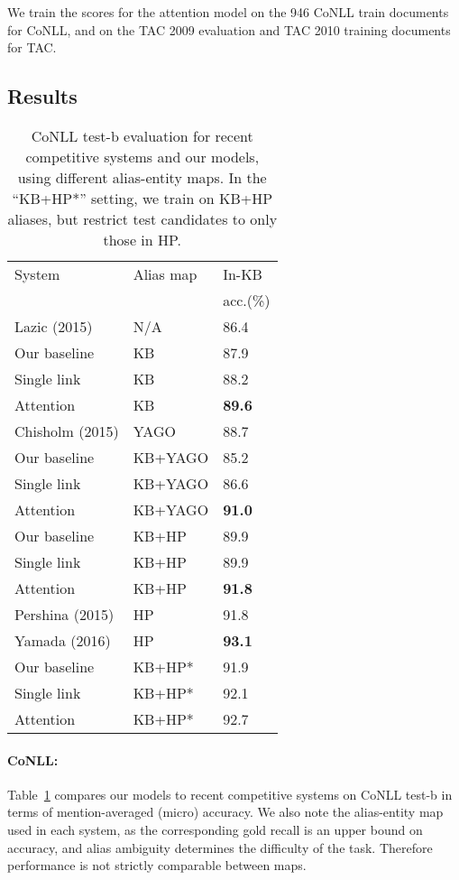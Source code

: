 We train the scores for the attention model on the 946 CoNLL train documents for CoNLL, and on the TAC 2009 evaluation and TAC 2010 training documents for TAC.  

\subsection{Results}
\begin{table}[t!]
  \centering
  \begin{tabular}{l|l|l}
    System                 &  Alias map  & In-KB  \\
    & & acc.(\%) \\
    \hline
    Lazic (2015)    & N/A          & 86.4 \\
    \hline
    Our baseline    & KB           & 87.9  \\
    Single link     & KB           & 88.2 \\
    Attention       & KB           & \textbf{89.6} \\
    \hline
        Chisholm (2015) & YAGO         & 88.7 \\ 
    Our baseline    & KB+YAGO      & 85.2 \\
    Single link     & KB+YAGO      & 86.6 \\
    Attention       & KB+YAGO      & {\bf 91.0} \\
    \hline
    Our baseline    & KB+HP        & 89.9 \\
    Single link & KB+HP & 89.9 \\
    Attention       & KB+HP        & {\bf 91.8} \\
    \hline
        Pershina (2015) & HP           & 91.8 \\
        Yamada (2016) & HP & {\bf 93.1} \\
    Our baseline &KB+HP* & 91.9 \\
    Single link     & KB+HP*       & 92.1 \\
    Attention       & KB+HP*       & {92.7} \\ \hline
  \end{tabular}
\caption{CoNLL test-b evaluation for recent competitive systems and
  our models, using different alias-entity maps.  In the ``KB+HP*''
  setting, we train on KB+HP aliases, but restrict test candidates to
  only those in HP.}
 \label{table:conll_results} 
\end{table}
\paragraph*{CoNLL:}
Table~\ref{table:conll_results} compares our models to recent
competitive systems on CoNLL test-b in terms of mention-averaged (micro)
accuracy.  We also note the alias-entity map used in each
system, as the corresponding gold recall is an upper bound on
accuracy, and alias ambiguity determines the difficulty of the task.
Therefore performance is not strictly comparable between maps.

